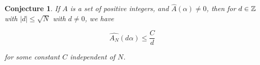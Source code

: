 \documentclass{report}
\newtheorem{conjecture}[theorem]{Conjecture}
\theoremstyle{remark}
\numberwithin{equation}{section}
\begin{document}
\begin{conjecture}\label{conj:decay} 
  If $A$ is a \relevant set of positive integers, and
  $\widehat{A}(\alpha) \neq 0$, then for $d \in \mathbb{Z}$ with $|d| \leq \sqrt{N}$ with $d \neq 0$,
  we have

  \[\widehat{A_N}(d\alpha) \leq \frac{C}{d}\]

  for some constant $C$ independent of $N$.  
\end{conjecture}






\end{document}
